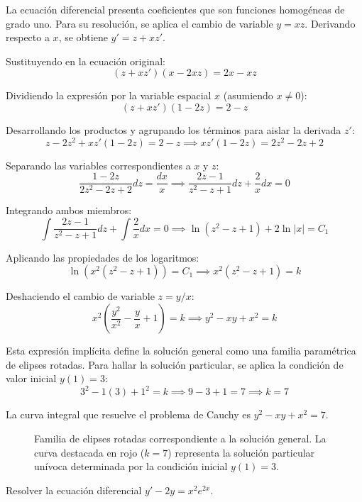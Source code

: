 \begin{tcolorbox}
La ecuación diferencial presenta coeficientes que son funciones homogéneas de grado uno. Para su resolución, se aplica el cambio de variable $y = xz$. Derivando respecto a $x$, se obtiene $y' = z + xz'$.

Sustituyendo en la ecuación original:
$$ (z + xz')(x - 2xz) = 2x - xz $$

Dividiendo la expresión por la variable espacial $x$ (asumiendo $x \neq 0$):
$$ (z + xz')(1 - 2z) = 2 - z $$

Desarrollando los productos y agrupando los términos para aislar la derivada $z'$:
$$ z - 2z^2 + xz'(1 - 2z) = 2 - z \implies xz'(1 - 2z) = 2z^2 - 2z + 2 $$

Separando las variables correspondientes a $x$ y $z$:
$$ \frac{1 - 2z}{2z^2 - 2z + 2} dz = \frac{dx}{x} \implies \frac{2z - 1}{z^2 - z + 1} dz + \frac{2}{x} dx = 0 $$

Integrando ambos miembros:
$$ \int \frac{2z - 1}{z^2 - z + 1} dz + \int \frac{2}{x} dx = 0 \implies \ln(z^2 - z + 1) + 2\ln|x| = C_1 $$

Aplicando las propiedades de los logaritmos:
$$ \ln(x^2(z^2 - z + 1)) = C_1 \implies x^2(z^2 - z + 1) = k $$

Deshaciendo el cambio de variable $z = y/x$:
$$ x^2\left(\frac{y^2}{x^2} - \frac{y}{x} + 1\right) = k \implies y^2 - xy + x^2 = k $$

Esta expresión implícita define la solución general como una familia paramétrica de elipses rotadas. Para hallar la solución particular, se aplica la condición de valor inicial $y(1) = 3$:
$$ 3^2 - 1(3) + 1^2 = k \implies 9 - 3 + 1 = 7 \implies k = 7 $$

La curva integral que resuelve el problema de Cauchy es $y^2 - xy + x^2 = 7$.

\begin{figure}[H]
    \centering
    
    \caption{Familia de elipses rotadas correspondiente a la solución general. La curva destacada en rojo ($k=7$) representa la solución particular unívoca determinada por la condición inicial $y(1)=3$.}
\end{figure}
\end{tcolorbox}

\begin{ejercicio}
Resolver la ecuación diferencial $y' - 2y = x^2 e^{2x}$.
\end{ejercicio}

